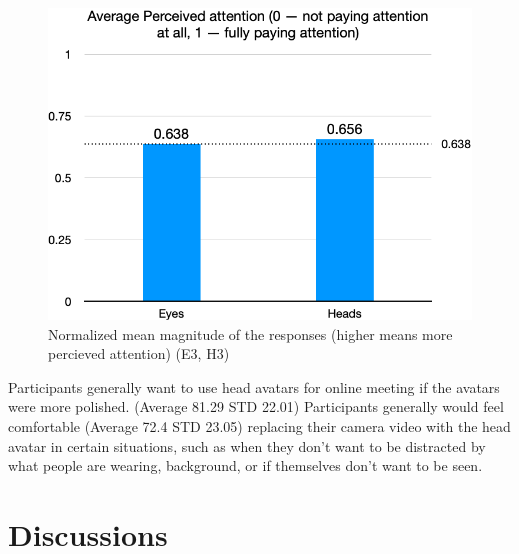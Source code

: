\begin{figure}
	\centering
 	\includegraphics[width=\textwidth]{matrix-amp.png}
	\caption{Normalized mean magnitude of the responses (higher means more percieved attention) (E3, H3)}
	\label{fig:matrix-attention}
\end{figure}







Participants generally want to use head avatars for online meeting if the avatars were more polished. (Average 81.29 STD 22.01) 
Participants generally would feel comfortable (Average 72.4 STD 23.05) replacing their camera video with the head avatar in certain situations, such as when they don’t want to be distracted by what people are wearing, background, or if themselves don’t want to be seen. 


\section{Discussions}


